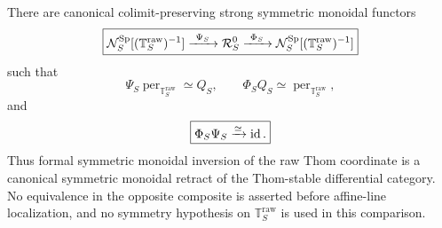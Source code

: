 \begin{theorem}
\label{thm:infinitesimal-raw-thom-periodization}
There are canonical colimit-preserving strong symmetric monoidal functors
\[
    \boxed{
    \mathcal N_S^{\mathrm{Sp}}
    [ (\mathbb T_S^{\mathrm{raw}})^{-1} ]
    \xrightarrow{\ \Psi_S\ }
    \mathcal R_S^0
    \xrightarrow{\ \Phi_S\ }
    \mathcal N_S^{\mathrm{Sp}}
    [ (\mathbb T_S^{\mathrm{raw}})^{-1} ]
    }
\]
such that
\[
    \Psi_S\operatorname{per}_{\mathbb T_S^{\mathrm{raw}}}
    \simeq
    Q_S,
    \qquad
    \Phi_SQ_S
    \simeq
    \operatorname{per}_{\mathbb T_S^{\mathrm{raw}}},
\]
and
\[
    \boxed{
    \Phi_S\Psi_S\xrightarrow{\simeq}\operatorname{id}.
    }
\]
Thus formal symmetric monoidal inversion of the raw Thom coordinate is a
canonical symmetric monoidal retract of the Thom-stable differential category.
No equivalence in the opposite composite is asserted before affine-line
localization, and no symmetry hypothesis on
$\mathbb T_S^{\mathrm{raw}}$ is used in this comparison.
\end{theorem}

